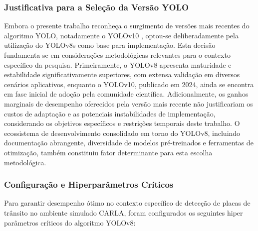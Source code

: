 \subsubsection{Justificativa para a Seleção da Versão YOLO} \label{subsubsec:just_yolo}

Embora o presente trabalho reconheça o surgimento de versões mais recentes do algoritmo YOLO, notadamente o YOLOv10 \cite{wang2024yolov10realtimeendtoendobject}, optou-se deliberadamente pela utilização do YOLOv8s como base para implementação. Esta decisão fundamenta-se em considerações metodológicas relevantes para o contexto específico da pesquisa. Primeiramente, o YOLOv8 apresenta maturidade e estabilidade significativamente superiores, com extensa validação em diversos cenários aplicativos, enquanto o YOLOv10, publicado em 2024, ainda se encontra em fase inicial de adoção pela comunidade científica. Adicionalmente, os ganhos marginais de desempenho oferecidos pela versão mais recente não justificariam os custos de adaptação e as potenciais instabilidades de implementação, considerando os objetivos específicos e restrições temporais deste trabalho. O ecossistema de desenvolvimento consolidado em torno do YOLOv8, incluindo documentação abrangente, diversidade de modelos pré-treinados e ferramentas de otimização, também constituiu fator determinante para esta escolha metodológica.

\subsubsection{Configuração e Hiperparâmetros Críticos} \label{subsubsec:hiperparametros_yolo}

Para garantir desempenho ótimo no contexto específico de detecção de placas de trânsito no ambiente simulado CARLA, foram configurados os seguintes hiper parâmetros críticos do algoritmo YOLOv8:

